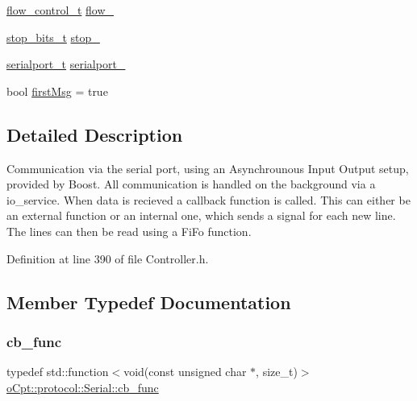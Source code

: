\begin{DoxyCompactItemize}
\hyperlink{classo_cpt_1_1protocol_1_1_serial_ad32f1d64fb16a5443d7aae92e8b14232}{flow\+\_\+control\+\_\+t} \hyperlink{classo_cpt_1_1protocol_1_1_serial_a08eb8b737e453a84f6db746c79c0fab1}{flow\+\_\+}
\item 
\hyperlink{classo_cpt_1_1protocol_1_1_serial_aadc4c803ade35920211e6c6a202a8c1f}{stop\+\_\+bits\+\_\+t} \hyperlink{classo_cpt_1_1protocol_1_1_serial_a0905cfeb2f2e21ce6a141e068813f75c}{stop\+\_\+}
\item 
\hyperlink{classo_cpt_1_1protocol_1_1_serial_a3949fae08041279672bcb29b94d4cd52}{serialport\+\_\+t} \hyperlink{classo_cpt_1_1protocol_1_1_serial_a3297de5a49ff3956439fcd5c030c75a0}{serialport\+\_\+}
\item 
bool \hyperlink{classo_cpt_1_1protocol_1_1_serial_affbe5790cd34027fa6b65dbb98f5d5bc}{first\+Msg} = true
\end{DoxyCompactItemize}


\subsection{Detailed Description}
Communication via the serial port, using an Asynchrounous Input Output setup, provided by Boost. All communication is handled on the background via a io\+\_\+service. When data is recieved a callback function is called. This can either be an external function or an internal one, which sends a signal for each new line. The lines can then be read using a Fi\+Fo function. 

Definition at line 390 of file Controller.\+h.



\subsection{Member Typedef Documentation}
\hypertarget{classo_cpt_1_1protocol_1_1_serial_ad55591180be8bea2fe3832b1265b7496}{}\label{classo_cpt_1_1protocol_1_1_serial_ad55591180be8bea2fe3832b1265b7496} 
\subsubsection{\texorpdfstring{cb\+\_\+func}{cb\_func}}
{\footnotesize\ttfamily typedef std\+::function$<$void(const unsigned char $\ast$, size\+\_\+t)$>$ \hyperlink{classo_cpt_1_1protocol_1_1_serial_ad55591180be8bea2fe3832b1265b7496}{o\+Cpt\+::protocol\+::\+Serial\+::cb\+\_\+func}}



